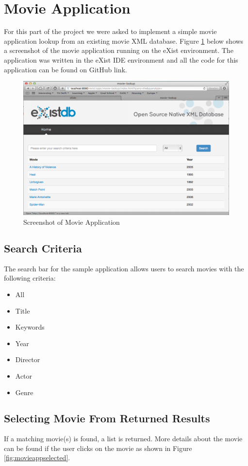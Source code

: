 \documentclass[MoviesApp.tex]{subfiles}
\begin{document}
\section{Movie Application}

For this part of the project we were asked to implement a simple movie application lookup from an existing movie XML database. Figure \ref{fig:movieapp} below shows a screenshot of the movie application running on the eXist environment. The application was written in the eXist IDE environment and all the code for this application can be found on GitHub link.

\begin{figure} [H]
	\centering
	\includegraphics[width=1\textwidth]{./Figures/MovieApp.png}
	\caption{Screenshot of Movie Application}
	\label{fig:movieapp}
\end{figure}

\subsection{Search Criteria}
The search bar for the sample application allows users to search movies with the following criteria:

\begin{itemize}
\item All
\item Title
\item Keywords
\item Year
\item Director
\item Actor
\item Genre
\end{itemize}

\subsection{Selecting Movie From Returned Results}
If a matching movie(s) is found, a list is returned. More details about the movie can be found if the user clicks on the movie as shown in Figure \ref{fig:movieappselected}.
\end{document}
